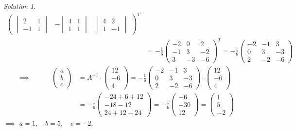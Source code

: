 \documentclass[
  english,
  12pt,
  oneside]{book}
\theoremstyle{definition}
\theoremstyle{definition}
\theoremstyle{definition}
\theoremstyle{definition}
\theoremstyle{remark}
\newtheorem*{solution}{Solution}
\begin{document}
\begin{solution}
\begin{align*}
\begin{pmatrix}
\begin{vmatrix}2&1\\-1&1\end{vmatrix}&-\begin{vmatrix}4&1\\1&1\end{vmatrix}&\begin{vmatrix}4&2\\1&-1\end{vmatrix}
\end{pmatrix}^T\\
&=-\frac{1}{6}\begin{pmatrix}
-2&0&2\\-1&3&-2\\3&-3&-6
\end{pmatrix}^T =
-\frac{1}{6}\begin{pmatrix}
-2&-1&3\\
0&3&-3\\
2&-2&-6
\end{pmatrix}
\end{align*}
\begin{align*}
\implies\quad\quad\quad
\begin{pmatrix}a\\b\\c\end{pmatrix} &=
A^{-1}\cdot \begin{pmatrix}12\\-6\\4\end{pmatrix}
= -\frac{1}{6}\begin{pmatrix}
-2&-1&3\\
0&3&-3\\
2&-2&-6
\end{pmatrix}\cdot \begin{pmatrix}12\\-6\\4\end{pmatrix}\\
&=-\frac{1}{6}\begin{pmatrix}-24+6+12\\-18-12\\24+12-24\end{pmatrix}
=-\frac{1}{6}\begin{pmatrix}-6\\-30\\12\end{pmatrix}
= \begin{pmatrix}1\\5\\-2\end{pmatrix}
\end{align*}
\(\implies\) \(a=1\), ~ \(b=5\), ~ \(c=-2\).
\end{solution}
\end{document}
